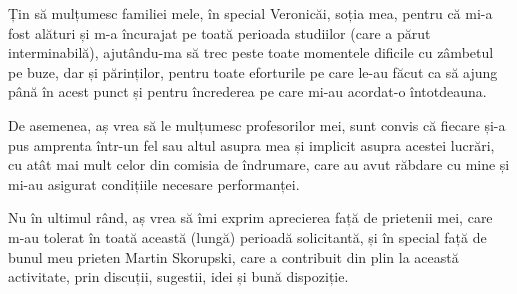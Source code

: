 Țin să mulțumesc familiei mele, în special Veronicăi, soția mea, pentru că mi-a fost alături și m-a încurajat pe toată perioada studiilor (care a părut interminabilă), ajutându-ma să trec peste toate momentele dificile cu zâmbetul pe buze, dar și părinților, pentru toate eforturile pe care le-au făcut ca să ajung până în acest punct și pentru încrederea pe care mi-au acordat-o întotdeauna.

De asemenea, aș vrea să le mulțumesc profesorilor mei, sunt convis că fiecare și-a pus amprenta într-un fel sau altul asupra mea și implicit asupra acestei lucrări, cu atât mai mult celor din comisia de îndrumare, care au avut răbdare cu mine și mi-au asigurat condițiile necesare performanței. 

Nu în ultimul rând, aș vrea să îmi exprim aprecierea față de prietenii mei, care m-au tolerat în toată această (lungă) perioadă solicitantă, și în special față de bunul meu prieten Martin Skorupski, care a contribuit din plin la această activitate, prin discuții, sugestii, idei și bună dispoziție.